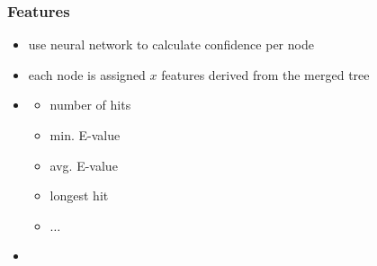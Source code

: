 \documentclass{beamer}
\begin{document}
\begin{frame}
	\frametitle{Features}
	\begin{itemize}
		\item use neural network to calculate confidence per node
		\item each node is assigned $x$ features derived from the merged tree
		\item[] \begin{itemize}
					\item number of hits
					\item min. E-value	
					\item avg. E-value \qquad[3, 0.0074, 0.45, 84, $\dots$]
					\item longest hit
					\item $\dots$ 
				\end{itemize}
				\item[] 
	\end{itemize}
\end{frame}
\end{document}
